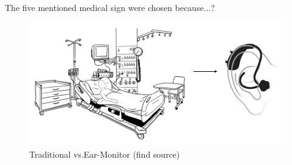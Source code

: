 The five mentioned medical sign were chosen because...?

\begin{figure}[h]
   \centering
   \includegraphics[scale=0.3]{figs/TraditionalICU}
   \caption{Traditional vs.Ear-Monitor (find source)}
   \label{fig:TraditionalICU}
\end{figure}